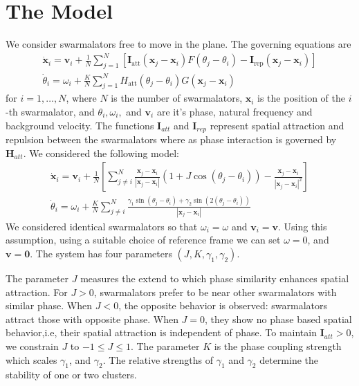 \documentclass[twocolumn,10pt]{asme2ej}
\begin{document}
\section{The Model}
{
    We consider swarmalators free to move in the plane. The governing equations are     \noindent
    \begin{gather}
        \dot{\mathbf{x}}_{i}=\mathbf{v}_{i}+\frac{1}{N} \sum_{j=1}^{N}\left[\mathbf{I}_{\mathrm{att}}\left(\mathbf{x}_{j}-\mathbf{x}_{i}\right) F\left(\theta_{j}   -\theta_{i}\right)-\mathbf{I}_{\mathrm{rep}}\left(\mathbf{x}_{j}-\mathbf{x}_{i}    \right)\right] \\
        \dot{\theta}_{i}=\omega_{i}+\frac{K}{N} \sum_{j=1}^{N} H_{\mathrm{att}}\left(\theta_{j}-\theta_{i}\right) G\left(\mathbf{x}_{j}-\mathbf{x}_{i}\right)
    \end{gather}
    for \(i = 1,\ldots,N\), where \(N\) is the number of swarmalators, $\mathbf{x}_{i} $ is the position of the \(i\)-th swarmalator, and $\theta_i,\omega_i,$ and $\mathbf{v}_i$ are it's phase, natural frequency and background velocity. The functions $\mathbf{I}_  {att}$ and $\mathbf{I}_{rep}$ represent spatial attraction and repulsion between the swarmalators where as phase interaction is governed by $\mathbf{H}_{att}$. We considered the following model:
    \begin{gather} 
        \dot{\mathbf{x}}_{i}=\mathbf{v}_{i}+\frac{1}{N}\left[\sum_{j \neq i}^{N} \frac  {\mathbf{x}_{j}-\mathbf{x}_{i}}{\left|\mathbf{x}_{j}-\mathbf{x}_{i}\right|}\left  (1+J \cos \left(\theta_{j}-\theta_{i}\right)\right)-\frac{\mathbf{x}_{j}-\mathbf{x}_{i}}{\left|\mathbf{x}_{j}-\mathbf{x}_{i}\right|^{2}}\right] \label{eq:space} \\
        \dot{\theta}_{i}=\omega_{i}+\frac{K}{N} \sum_{j \neq i}^{N} \frac{\gamma_1 \sin\left(\theta_{j}-\theta_{i}\right) + \gamma_2 \sin \left(2 \left(\theta_j -\theta_i\right)\right) }{\left|\mathbf{x}_{j}-\mathbf{x}_{i}\right|} \label{eq:phase}
    \end{gather}
    We considered identical swarmalators so that $\omega_i = \omega$ and $\mathbf{v}_i = \mathbf{v}$. Using this assumption, using a suitable choice of reference frame we  can set $\omega = 0$, and $\mathbf{v} = \mathbf{0}$. The system has four parameters $\left(J,K,\gamma_1,\gamma_2\right )$.

    The parameter \(J\) measures the extend to which phase similarity enhances spatial attraction. For $J>0$, swarmalators prefer to be near other swarmalators with  similar phase. When $J<0$, the opposite behavior is observed: swarmalators attract those with opposite phase. When $J=0$, they show no phase based spatial behavior,i.e, their spatial attraction is independent of phase. To maintain $\mathbf{I}_{att}> 0$, we constrain $J$ to $-1 \leq J \leq 1$. The parameter $K$ is the phase coupling strength which scales $\gamma_1$, and $\gamma_2$. The relative  strengths of $\gamma_1$ and $\gamma_2$ determine the stability of one or two clusters. 
    
}
\end{document}

